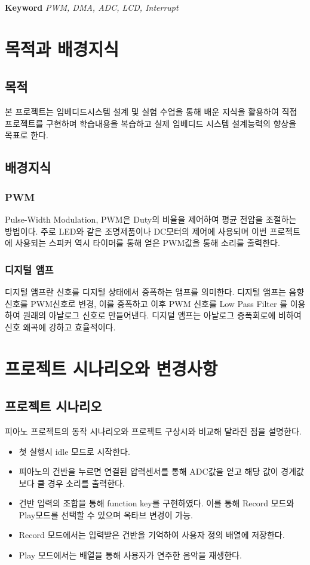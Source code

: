 \documentclass[a4paper,11pt]{article}
\begin{document}
\textbf{Keyword} \textit{PWM, DMA, ADC, LCD, Interrupt}
\newpage
\tableofcontents
{}
\listoffigures
{}
\newpage
{}
\setcounter{page}{1}
\begin{spacing}{1.6}
\section{목적과 배경지식}
\subsection{목적}
본 프로젝트는 임베디드시스템 설계 및 실험 수업을 통해 배운 지식을 활용하여 직접 프로젝트를 구현하며 학습내용을 복습하고 실제 임베디드 시스템 설계능력의 향상을 목표로 한다.
\subsection{배경지식}
\subsubsection{PWM}
Pulse-Width Modulation, PWM은 Duty의 비율을 제어하여 평균 전압을 조절하는 방법이다. 주로 LED와 같은 조명제품이나 DC모터의 제어에 사용되며 이번 프로젝트에 사용되는 스피커 역시 타이머를 통해 얻은 PWM값을 통해 소리를 출력한다.

\subsubsection{디지털 앰프}
디지털 앰프란 신호를 디지털 상태에서 증폭하는 앰프를 의미한다. 디지털 앰프는 음향 신호를 PWM신호로 변경, 이를 증폭하고 이후 PWM 신호를 Low Pass Filter 를 이용하여 원래의 아날로그 신호로 만들어낸다. 디지털 앰프는 아날로그 증폭회로에 비하여 신호 왜곡에 강하고 효율적이다.

\section{프로젝트 시나리오와 변경사항}
 \subsection{프로젝트 시나리오}
 피아노 프로젝트의 동작 시나리오와 프로젝트 구상시와 비교해 달라진 점을 설명한다.
 \begin{itemize}
   \item  첫 실행시 idle 모드로 시작한다.
   \item  피아노의 건반을 누르면 연결된 압력센서를 통해 ADC값을 얻고 해당 값이 경계값보다 클 경우 소리를 출력한다.
   \item  건반 입력의 조합을 통해 function key를 구현하였다. 이를 통해   Record 모드와 Play모드를 선택할 수 있으며 옥타브 변경이 가능.
   \item  Record 모드에서는 입력받은 건반을 기억하여 사용자 정의 배열에 저장한다.
   \item  Play 모드에서는 배열을 통해 사용자가 연주한 음악을 재생한다.
 \end{itemize}


\end{spacing}
\end{document}
